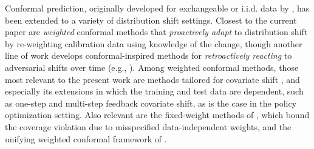 Conformal prediction, originally developed for exchangeable or i.i.d. data by \cite{vovk2005algorithmic}, has been extended to a variety of distribution shift settings. Closest to the current paper are \textit{weighted} conformal methods that \textit{proactively adapt} to distribution shift by re-weighting calibration data using knowledge of the change, though another line of work develops conformal-inspired methods for \textit{retroactively reacting} to adversarial shifts over time (e.g., \citet{Gibbs2021-ed, zaffran2022adaptive, bastani2022, Angelopoulos_pid}). Among weighted conformal methods, those most relevant to the present work are methods tailored for covariate shift \cite{tibshirani2019conformal, prinster2022jaws, yang2024doubly, jonkers2024conformal}, and especially its extensions in which the training and test data are dependent, such as one-step \cite{fannjiang2022conformal, prinster2023jaws} and multi-step \cite{nair2023randomization, prinster2024conformal} feedback covariate shift, as is the case in the policy optimization setting. Also relevant are the fixed-weight methods of \citet{barber2023}, which bound the coverage violation due to misspecified data-independent weights, and the unifying weighted conformal framework of \citet{barber2025unifying}.


